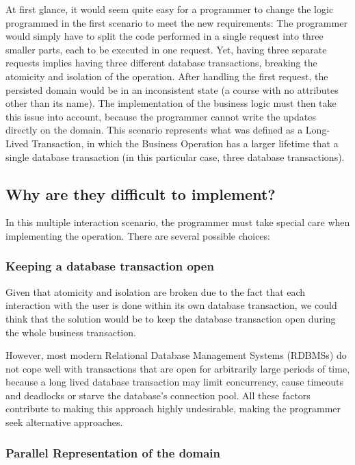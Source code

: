 \documentclass{llncs}
\begin{document}
At first glance, it would seem quite easy for a programmer to change
the logic programmed in the first scenario to meet the new
requirements: The programmer would simply have to split the code
performed in a single request into three smaller parts, each to be
executed in one request. Yet, having three separate requests implies
having three different database transactions, breaking the atomicity
and isolation of the operation. After handling the first request, the
persisted domain would be in an inconsistent state (a course with no
attributes other than its name). The implementation of the business
logic must then take this issue into account, because the programmer
cannot write the updates directly on the domain. This scenario
represents what was defined as a Long-Lived Transaction, in which the
Business Operation has a larger lifetime that a single database
transaction (in this particular case, three database transactions).

\subsection{Why are they difficult to implement?}
\label{sec:difficult}

In this multiple interaction scenario, the programmer must take
special care when implementing the operation. There are several
possible choices:

\subsubsection{Keeping a database transaction open}

Given that atomicity and isolation are broken due to the fact that
each interaction with the user is done within its own database
transaction, we could think that the solution would be to keep the
database transaction open during the whole business transaction.

However, most modern Relational Database Management Systems (RDBMSs)
do not cope well with transactions that are open for arbitrarily large
periods of time, because a long lived database transaction may limit
concurrency, cause timeouts and deadlocks or starve the database's
connection pool. All these factors contribute to making this approach
highly undesirable, making the programmer seek alternative approaches.

\subsubsection{Parallel Representation of the domain}
\end{document}
